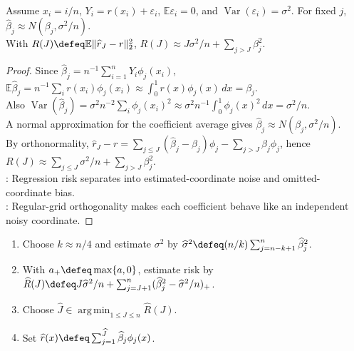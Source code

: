 \begin{theorem} \label{thm:orthogonal-regression-coefficients-risk} \\
Assume $x_i=i/n$, $Y_i=r(x_i)+\varepsilon_i$, $\mathbb{E}\varepsilon_i=0$, and $\operatorname{Var}(\varepsilon_i)=\sigma^2$. For fixed $j$, $\widehat\beta_j\approx N(\beta_j,\sigma^2/n)$.\\
With $R(J)\defeq\mathbb{E}\|\widehat r_J-r\|_2^2$, $R(J)\approx J\sigma^2/n+\sum_{j>J}\beta_j^2$.
\begin{proof} Since $\widehat\beta_j=n^{-1}\sum_{i=1}^{n}Y_i\phi_j(x_i)$, $\mathbb{E}\widehat\beta_j=n^{-1}\sum_i r(x_i)\phi_j(x_i)\approx\int_0^1r(x)\phi_j(x)\,dx=\beta_j$.\\
Also $\operatorname{Var}(\widehat\beta_j)=\sigma^2n^{-2}\sum_i\phi_j(x_i)^2\approx\sigma^2n^{-1}\int_0^1\phi_j(x)^2\,dx=\sigma^2/n$.\\
A normal approximation for the coefficient average gives $\widehat\beta_j\approx N(\beta_j,\sigma^2/n)$.\\
By orthonormality, $\widehat r_J-r=\sum_{j\leq J}(\widehat\beta_j-\beta_j)\phi_j-\sum_{j>J}\beta_j\phi_j$, hence $R(J)\approx\sum_{j\leq J}\sigma^2/n+\sum_{j>J}\beta_j^2$.\\
: Regression risk separates into estimated-coordinate noise and omitted-coordinate bias.\\
: Regular-grid orthogonality makes each coefficient behave like an independent noisy coordinate.
\end{proof}
\end{theorem}

\begin{method} \label{meth:orthogonal-series-regression-react} 
\begin{enumerate}[label=(\roman*)]
\setlength{\itemsep}{0pt}
\item Choose $k\approx n/4$ and estimate $\sigma^2$ by $\widehat\sigma^2\defeq(n/k)\sum_{j=n-k+1}^{n}\widehat\beta_j^2$.
\item With $a_+\defeq\max\{a,0\}$, estimate risk by $\widehat R(J)\defeq J\widehat\sigma^2/n+\sum_{j=J+1}^{n}(\widehat\beta_j^2-\widehat\sigma^2/n)_+$.
\item Choose $\widehat J\in\operatorname*{arg\,min}_{1\leq J\leq n}\widehat R(J)$.
\item Set $\widehat r(x)\defeq\sum_{j=1}^{\widehat J}\widehat\beta_j\phi_j(x)$.
\end{enumerate}
\end{method}

